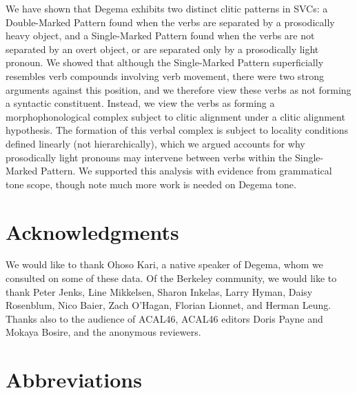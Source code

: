 \documentclass[output=paper]{langsci/langscibook}
\begin{document}
We have shown that Degema exhibits two distinct clitic patterns in SVCs: a Double-Marked Pattern found when the verbs are separated by a prosodically heavy object, and a Single-Marked Pattern found when the verbs are not separated by an overt object, or are separated only by a prosodically light pronoun. We showed that although the Single-Marked Pattern superficially resembles verb compounds involving verb movement, there were two strong arguments against this position, and we therefore view these verbs as not forming a syntactic constituent. Instead, we view the verbs as forming a morphophonological complex subject to clitic alignment under a clitic alignment hypothesis. The formation of this verbal complex is subject to locality conditions defined linearly (not hierarchically), which we argued accounts for why prosodically light pronouns may intervene between verbs within the Single-Marked Pattern. We supported this analysis with evidence from grammatical tone scope, though note much more work is needed on Degema tone.

\chapter{Acknowledgments}

\begin{styleNoSpacing}
We would like to thank Ohoso Kari, a native speaker of Degema, whom we consulted on some of these data. Of the Berkeley community, we would like to thank Peter Jenks, Line Mikkelsen, Sharon Inkelas, Larry Hyman, Daisy Rosenblum, Nico Baier, Zach O’Hagan, Florian Lionnet, and Herman Leung. Thanks also to the audience of ACAL46, ACAL46 editors Doris Payne and Mokaya Bosire, and the anonymous reviewers.
\end{styleNoSpacing}

\chapter{Abbreviations}
\end{document}
